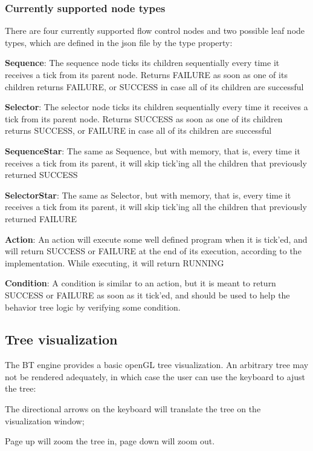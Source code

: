 \subsubsection*{Currently supported node types}

There are four currently supported flow control nodes and two possible leaf node types, which are defined in the json file by the {\ttfamily type} property\-:
\begin{DoxyItemize}
\item {\bfseries Sequence}\-: The sequence node ticks its children sequentially every time it receives a tick from its parent node. Returns {\ttfamily F\-A\-I\-L\-U\-R\-E} as soon as one of its children returns {\ttfamily F\-A\-I\-L\-U\-R\-E}, or {\ttfamily S\-U\-C\-C\-E\-S\-S} in case all of its children are successful
\item {\bfseries Selector}\-: The selector node ticks its children sequentially every time it receives a tick from its parent node. Returns {\ttfamily S\-U\-C\-C\-E\-S\-S} as soon as one of its children returns {\ttfamily S\-U\-C\-C\-E\-S\-S}, or {\ttfamily F\-A\-I\-L\-U\-R\-E} in case all of its children are successful
\item {\bfseries Sequence\-Star}\-: The same as Sequence, but with memory, that is, every time it receives a tick from its parent, it will skip tick'ing all the children that previously returned {\ttfamily S\-U\-C\-C\-E\-S\-S}
\item {\bfseries Selector\-Star}\-: The same as Selector, but with memory, that is, every time it receives a tick from its parent, it will skip tick'ing all the children that previously returned {\ttfamily F\-A\-I\-L\-U\-R\-E}
\item {\bfseries Action}\-: An action will execute some well defined program when it is tick'ed, and will return {\ttfamily S\-U\-C\-C\-E\-S\-S} or {\ttfamily F\-A\-I\-L\-U\-R\-E} at the end of its execution, according to the implementation. While executing, it will return {\ttfamily R\-U\-N\-N\-I\-N\-G}
\item {\bfseries Condition}\-: A condition is similar to an action, but it is meant to return {\ttfamily S\-U\-C\-C\-E\-S\-S} or {\ttfamily F\-A\-I\-L\-U\-R\-E} as soon as it tick'ed, and should be used to help the behavior tree logic by verifying some condition.
\end{DoxyItemize}

\subsection*{Tree visualization }

The B\-T engine provides a basic open\-G\-L tree visualization. An arbitrary tree may not be rendered adequately, in which case the user can use the keyboard to ajust the tree\-:
\begin{DoxyItemize}
\item The directional arrows on the keyboard will translate the tree on the visualization window;
\item Page up will zoom the tree in, page down will zoom out. 
\end{DoxyItemize}